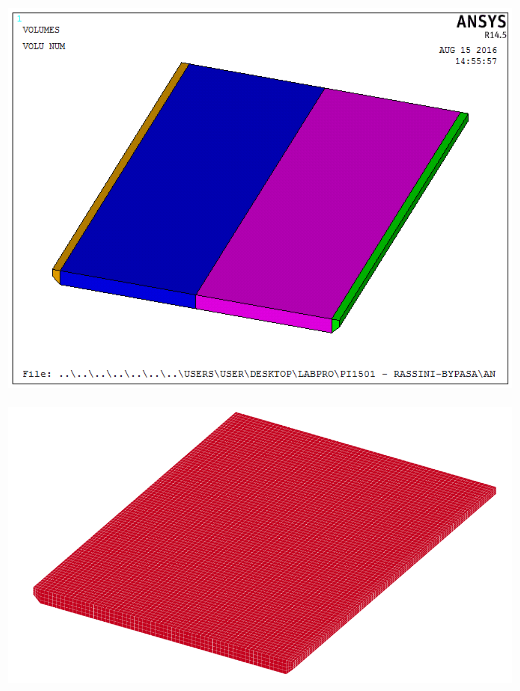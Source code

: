 \begin{center}
\includegraphics[scale=0.6]{src/ch3/blank_segmentado.png}
\label{fig:blank_seg}
\end{center}


\begin{center}
\includegraphics[scale=0.6]{src/ch3/mesh_blank.png}
\label{fig:mesh_blank}
\end{center}

